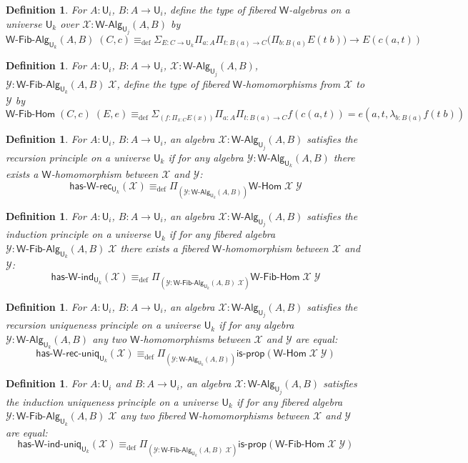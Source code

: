 \documentclass[reqno,10pt,a4paper,oneside]{amsart}
\numberwithin{equation}{section}
\theoremstyle{mythm}
\theoremstyle{mydef}
\newtheorem{definition}[theorem]{Definition}
\theoremstyle{myrmk}
\newcommand{\deq}{\equiv}
\newcommand{\defeq}{\deq_{\mathrm{def}}}
\newcommand{\isprop}{\mathsf{is}\text{-}\mathsf{prop}}
\newcommand{\prd}[1]{\Pi_{#1}}
\newcommand{\sm}[1]{\Sigma_{#1}}
\newcommand{\lam}[1]{\lambda_{#1}}
\newcommand{\W}{\mathsf{W}}
\newcommand{\UU}{\mathsf{U}}
\newcommand{\WAlg}{\mathsf{W}\text{-}\mathsf{Alg}}
\newcommand{\WFibAlg}{\mathsf{W}\text{-}\mathsf{Fib}\text{-}\mathsf{Alg}}
\newcommand{\WHom}{\mathsf{W}\text{-}\mathsf{Hom}}
\newcommand{\WFibHom}{\mathsf{W}\text{-}\mathsf{Fib}\text{-}\mathsf{Hom}}
\newcommand{\HasWRec}{\mathsf{has}\text{-}\mathsf{W}\text{-}\mathsf{rec}}
\newcommand{\HasWInd}{\mathsf{has}\text{-}\mathsf{W}\text{-}\mathsf{ind}}
\newcommand{\HasWRecUniq}{\mathsf{has}\text{-}\mathsf{W}\text{-}\mathsf{rec}\text{-}\mathsf{uniq}}
\newcommand{\HasWIndUniq}{\mathsf{has}\text{-}\mathsf{W}\text{-}\mathsf{ind}\text{-}\mathsf{uniq}}
\newcommand{\X}{\mathcal{X}}
\newcommand{\Y}{\mathcal{Y}}
\begin{document}

\begin{definition}\label{def:WFibAlg}
For $A:\UU_i$, $B : A \to \UU_i$, define the type of \emph{fibered $\W$-algebras} on a universe $\UU_k$ over $\mathcal{X} : \WAlg_{\UU_j}(A,B)$ by
\[\WFibAlg_{\UU_k}(A,B) \; (C,c) \defeq \sm{E : C \to \UU_k} \prd{a:A}\prd{t: B(a) \to C} \big(\prd{b:B(a)} E(t \;b) \big) \to E(c(a,t)) \]
\end{definition}

\begin{definition}\label{def:WFibHom}
For $A:\UU_i$, $B : A \to \UU_i$, $\X : \WAlg_{\UU_j}(A,B)$, $\Y : \WFibAlg_{\UU_k}(A,B) \; \X$, define the type of \emph{fibered $\W$-homomorphisms} from $\X$ to $\Y$ by
\[ \WFibHom \; (C,c) \; (E,e) \defeq \sm{(f:\prd{x:C}E(x))}\prd{a:A}\prd{t: B(a) \to C} f(c(a,t)) = e(a,t,\lam{b:B(a)} f(t\;b)) \]
\end{definition}



\begin{definition}\label{def:WRec}
For $A:\UU_i$, $B : A \to \UU_i$, an algebra $\X : \WAlg_{\UU_j}(A,B)$ \emph{satisfies the recursion principle} on a universe $\UU_k$ if for any algebra $\Y : \WAlg_{\UU_k}(A,B)$ there exists
a $\W$-homomorphism between $\X$ and $\Y$:
\[ \HasWRec_{\UU_k}(\X) \defeq \prd{(\Y:\WAlg_{\UU_k}(A,B))} \WHom \; \X \; \Y \]
\end{definition}

\begin{definition}\label{def:WInd}
For $A:\UU_i$, $B : A \to \UU_i$, an algebra $\X : \WAlg_{\UU_j}(A,B)$ \emph{satisfies the induction principle} on a universe $\UU_k$ if for any fibered algebra $\Y : \WFibAlg_{\UU_k}(A,B) \; \X$ there exists a fibered $\W$-homomorphism between $\X$ and $\Y$:
\[ \HasWInd_{\UU_k}(\X) \defeq \prd{(\Y:\WFibAlg_{\UU_k}(A,B) \; \X)} \WFibHom \; \X \; \Y \]
\end{definition}

\begin{definition}\label{def:WRecUniq}
For $A:\UU_i$, $B : A \to \UU_i$, an algebra $\X : \WAlg_{\UU_j}(A,B)$ \emph{satisfies the recursion uniqueness principle} on a universe $\UU_k$ if for any algebra $\Y : \WAlg_{\UU_k}(A,B)$
any two $\W$-homomorphisms between $\X$ and $\Y$ are equal:
\[ \HasWRecUniq_{\UU_k}(\X) \defeq \prd{(\Y:\WAlg_{\UU_k}(A,B))} \isprop(\WHom \; \X \; \Y) \]
\end{definition}

\begin{definition}\label{def:WIndUniq}
For $A:\UU_i$ and $B : A \to \UU_i$, an algebra $\X : \WAlg_{\UU_j}(A,B)$ \emph{satisfies the induction uniqueness principle} on a universe $\UU_k$ if for any fibered algebra $\Y : \WFibAlg_{\UU_k}(A,B) \; \X$ any two fibered $\W$-homomorphisms between $\X$ and $\Y$ are equal:
\[ \HasWIndUniq_{\UU_k}(\X) \defeq \prd{(\Y:\WFibAlg_{\UU_k}(A,B) \; \X)} \isprop(\WFibHom \; \X \; \Y) \]
\end{definition}
\end{document}
